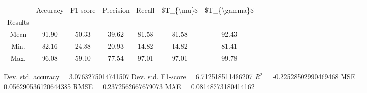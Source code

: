 \begin{tabular}{|c|c|c|c|c|c|c|}
\toprule
{} &  Accuracy &  F1 score &  Precision &  Recall &  \$T\_\{\textbackslash mu\}\$ &  \$T\_\{\textbackslash gamma\}\$ \\
Results &           &           &            &         &            &               \\
\hline
Mean    &     91.90 &     50.33 &      39.62 &   81.58 &      81.58 &         92.43 \\
Min.    &     82.16 &     24.88 &      20.93 &   14.82 &      14.82 &         81.41 \\
Max.    &     96.08 &     59.10 &      77.54 &   97.01 &      97.01 &         99.78 \\
\bottomrule
\end{tabular}

 Dev. std. accuracy = 3.0763275014741507
 Dev. std. F1-score = 6.712518511486207
 $R^2$ = -0.22528502990469468
 MSE = 0.056290536120644385
 RMSE = 0.2372562667679073
 MAE = 0.08148373180414162